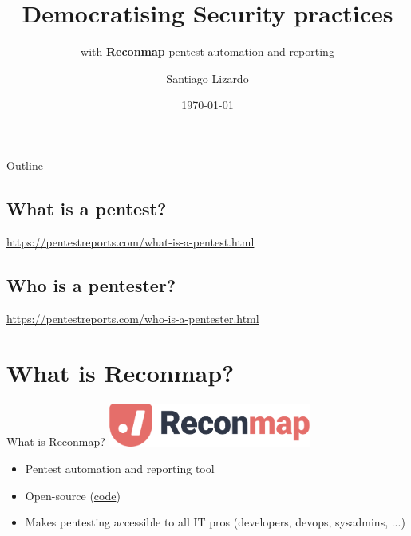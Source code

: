 \documentclass{beamer}
\title{Democratising Security practices}
\subtitle{with \textbf{Reconmap} pentest automation and reporting}
\author{Santiago Lizardo}
\date{\today}
\begin{document}
\begin{frame}
\titlepage    
\end{frame}

\begin{frame}{Outline}
    \tableofcontents
\end{frame}

\begin{frame}{\section{What is a pentest?}}
    \href{https://pentestreports.com/what-is-a-pentest.html}{https://pentestreports.com/what-is-a-pentest.html}
\end{frame}

\begin{frame}{\section{Who is a pentester?}}
    \href{https://pentestreports.com/who-is-a-pentester.html}{https://pentestreports.com/who-is-a-pentester.html}
\end{frame}

\section{What is Reconmap?}

\begin{frame}{What is Reconmap?}
    \includegraphics[width=0.5\textwidth]{reconmap-logo.png}
    \begin{itemize}
        \item Pentest automation and reporting tool
        \item Open-source (\href{https://github.com/reconmap}{code})
        \item Makes pentesting accessible to all IT pros (developers, devops, sysadmins, ...)
    \end{itemize}
\end{frame}
\end{document}
